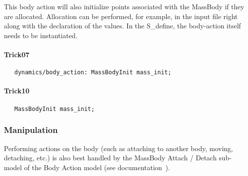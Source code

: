 This body action will also initialize points associated with the MassBody if
they are allocated.  Allocation can be performed, for example, in the input
file right along with the declaration of the values.  In the S\_define, the
body-action itself needs to be instantiated.
\paragraph{Trick07}
\begin{verbatim}
   dynamics/body_action: MassBodyInit mass_init;
\end{verbatim}
\paragraph{Trick10}
\begin{verbatim}
   MassBodyInit mass_init;
\end{verbatim}

\subsubsection{Manipulation}
Performing actions on the body (such as attaching to another body, moving,
detaching, etc.) is also best handled by the MassBody Attach / Detach
sub-model of the Body Action model (see
documentation~\cite{dynenv:BODYACTION}).


